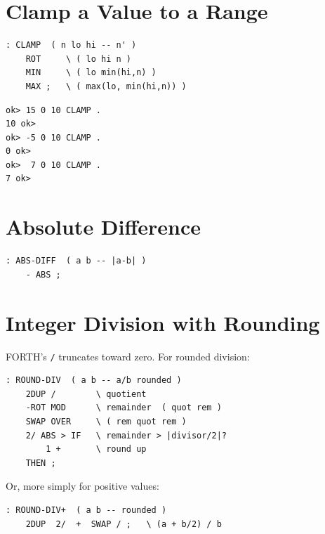 \section{Clamp a Value to a Range}
\label{sec:idiom-clamp}

\begin{lstlisting}[language=Forth]
: CLAMP  ( n lo hi -- n' )
    ROT     \ ( lo hi n )
    MIN     \ ( lo min(hi,n) )
    MAX ;   \ ( max(lo, min(hi,n)) )
\end{lstlisting}

\begin{lstlisting}[language=Forth]
ok> 15 0 10 CLAMP .
10 ok>
ok> -5 0 10 CLAMP .
0 ok>
ok>  7 0 10 CLAMP .
7 ok>
\end{lstlisting}

\section{Absolute Difference}
\label{sec:idiom-abs-diff}

\begin{lstlisting}[language=Forth]
: ABS-DIFF  ( a b -- |a-b| )
    - ABS ;
\end{lstlisting}

\section{Integer Division with Rounding}
\label{sec:idiom-round-div}

FORTH's \texttt{/} truncates toward zero. For rounded division:

\begin{lstlisting}[language=Forth]
: ROUND-DIV  ( a b -- a/b rounded )
    2DUP /        \ quotient
    -ROT MOD      \ remainder  ( quot rem )
    SWAP OVER     \ ( rem quot rem )
    2/ ABS > IF   \ remainder > |divisor/2|?
        1 +       \ round up
    THEN ;
\end{lstlisting}

Or, more simply for positive values:

\begin{lstlisting}[language=Forth]
: ROUND-DIV+  ( a b -- rounded )
    2DUP  2/  +  SWAP / ;   \ (a + b/2) / b
\end{lstlisting}

